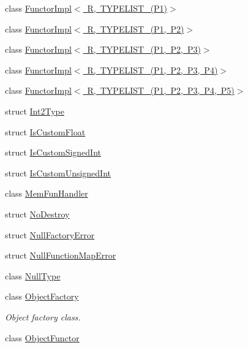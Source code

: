 \begin{DoxyCompactItemize}
\item 
class \mbox{\hyperlink{classUtil_1_1FunctorImpl_3_01R_00_01TYPELIST__1_07P1_08_4}{Functor\+Impl$<$ R, T\+Y\+P\+E\+L\+I\+S\+T\+\_(\+P1)$>$}}
\item 
class \mbox{\hyperlink{classUtil_1_1FunctorImpl_3_01R_00_01TYPELIST__2_07P1_00_01P2_08_4}{Functor\+Impl$<$ R, T\+Y\+P\+E\+L\+I\+S\+T\+\_(\+P1, P2)$>$}}
\item 
class \mbox{\hyperlink{classUtil_1_1FunctorImpl_3_01R_00_01TYPELIST__3_07P1_00_01P2_00_01P3_08_4}{Functor\+Impl$<$ R, T\+Y\+P\+E\+L\+I\+S\+T\+\_(\+P1, P2, P3)$>$}}
\item 
class \mbox{\hyperlink{classUtil_1_1FunctorImpl_3_01R_00_01TYPELIST__4_07P1_00_01P2_00_01P3_00_01P4_08_4}{Functor\+Impl$<$ R, T\+Y\+P\+E\+L\+I\+S\+T\+\_(\+P1, P2, P3, P4)$>$}}
\item 
class \mbox{\hyperlink{classUtil_1_1FunctorImpl_3_01R_00_01TYPELIST__5_07P1_00_01P2_00_01P3_00_01P4_00_01P5_08_4}{Functor\+Impl$<$ R, T\+Y\+P\+E\+L\+I\+S\+T\+\_(\+P1, P2, P3, P4, P5)$>$}}
\item 
struct \mbox{\hyperlink{structUtil_1_1Int2Type}{Int2\+Type}}
\item 
struct \mbox{\hyperlink{structUtil_1_1IsCustomFloat}{Is\+Custom\+Float}}
\item 
struct \mbox{\hyperlink{structUtil_1_1IsCustomSignedInt}{Is\+Custom\+Signed\+Int}}
\item 
struct \mbox{\hyperlink{structUtil_1_1IsCustomUnsignedInt}{Is\+Custom\+Unsigned\+Int}}
\item 
class \mbox{\hyperlink{classUtil_1_1MemFunHandler}{Mem\+Fun\+Handler}}
\item 
struct \mbox{\hyperlink{structUtil_1_1NoDestroy}{No\+Destroy}}
\item 
struct \mbox{\hyperlink{structUtil_1_1NullFactoryError}{Null\+Factory\+Error}}
\item 
struct \mbox{\hyperlink{structUtil_1_1NullFunctionMapError}{Null\+Function\+Map\+Error}}
\item 
class \mbox{\hyperlink{classUtil_1_1NullType}{Null\+Type}}
\item 
class \mbox{\hyperlink{classUtil_1_1ObjectFactory}{Object\+Factory}}
\begin{DoxyCompactList}\small\item\em Object factory class. \end{DoxyCompactList}\item 
class \mbox{\hyperlink{classUtil_1_1ObjectFunctor}{Object\+Functor}}
\item 

\end{DoxyCompactItemize}
